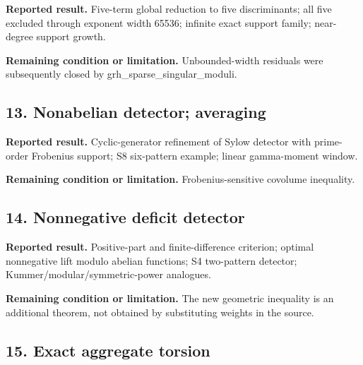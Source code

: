 \href{https://github.com/VladimirReshetnikov/ProveIt/blob/274841c1cb137aafbb60ab5f519c51fd42eee98e/docs/incoming/grh_cm_sparse_equations.zip}{}

\textbf{Reported result.} Five-term global reduction to five discriminants; all five excluded through exponent width 65536; infinite exact support family; near-degree support growth.

\textbf{Remaining condition or limitation.} Unbounded-width residuals were subsequently closed by grh\_sparse\_singular\_moduli.

\subsection*{13. Nonabelian detector; averaging}

\href{https://github.com/VladimirReshetnikov/ProveIt/blob/274841c1cb137aafbb60ab5f519c51fd42eee98e/docs/incoming/grh_cyclic_generator_transfer_2026-11-25.zip}{}

\textbf{Reported result.} Cyclic-generator refinement of Sylow detector with prime-order Frobenius support; S8 six-pattern example; linear gamma-moment window.

\textbf{Remaining condition or limitation.} Frobenius-sensitive covolume inequality.

\subsection*{14. Nonnegative deficit detector}

\href{https://github.com/VladimirReshetnikov/ProveIt/blob/274841c1cb137aafbb60ab5f519c51fd42eee98e/docs/incoming/grh_deficit_transfer_2026-11-25.zip}{}

\textbf{Reported result.} Positive-part and finite-difference criterion; optimal nonnegative lift modulo abelian functions; S4 two-pattern detector; Kummer/modular/symmetric-power analogues.

\textbf{Remaining condition or limitation.} The new geometric inequality is an additional theorem, not obtained by substituting weights in the source.

\subsection*{15. Exact aggregate torsion}

\href{https://github.com/VladimirReshetnikov/ProveIt/blob/274841c1cb137aafbb60ab5f519c51fd42eee98e/docs/incoming/grh_exact_torsion_transfer_2026-11-25.zip}{}

